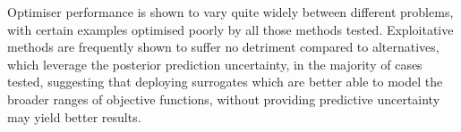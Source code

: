 \documentclass[conference]{IEEEtran}
\begin{document}
Optimiser performance is shown to vary quite widely between different problems, with certain examples optimised poorly by all those methods tested. Exploitative methods are frequently shown to suffer no detriment compared to alternatives, which leverage the posterior prediction uncertainty, in the majority of cases tested, suggesting that deploying surrogates which are better able to model the broader ranges of objective functions, without providing predictive uncertainty may yield better results. 






\end{document}
